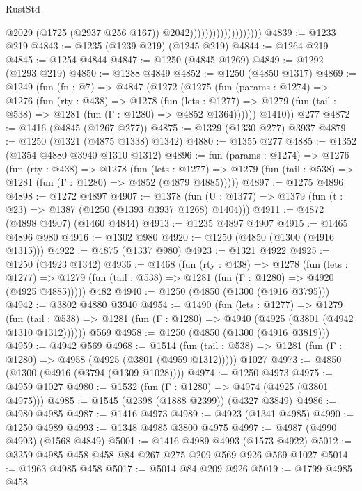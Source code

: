 \begin{lexlean}{RustStd}
\begin{coremodule}
{\begin{coremodule}
{{{{{{{{{{{{{                                          @2029
                                          (@1725 (@2937 @256 @167))
                                          @2042)))))))))))))))))))
@4839 := @1233 @219
@4843 := @1235 (@1239 @219) (@1245 @219)
@4844 := @1264 @219
@4845 := @1254 @4844
@4847 := @1250 (@4845 @1269)
@4849 := @1292 (@1293 @219)
@4850 := @1288 @4849
@4852 := @1250 (@4850 @1317)
@4869 := @1249
    (fun (fn : @7) =>
    @4847
      (@1272
        (@1275
          (fun (params : @1274) =>
          @1276
            (fun (rty : @438) =>
            @1278
              (fun (lets : @1277) =>
              @1279 (fun (tail : @538) => @1281 (fun (Γ : @1280) => @4852 @1364))))))
        @1410))
    @277
@4872 := @1416 (@4845 (@1267 @277))
@4875 := @1329 (@1330 @277) @3937
@4879 := @1250 (@1321 (@4875 @1338) @1342)
@4880 := @1355 @277
@4885 := @1352 (@1354 @4880 @3940 @1310 @1312)
@4896 := fun (params : @1274) =>
  @1276
    (fun (rty : @438) =>
    @1278
      (fun (lets : @1277) =>
      @1279 (fun (tail : @538) => @1281 (fun (Γ : @1280) => @4852 (@4879 @4885)))))
@4897 := @1275 @4896
@4898 := @1272 @4897
@4907 := @1378 (fun (U : @1377) => @1379 (fun (t : @23) => @1387 (@1250 (@1393 @3937 @1268) @1404)))
@4911 := @4872 (@4898 @4907) (@1460 @4844)
@4913 := @1235 @4897 @4907
@4915 := @1465 @4896 @980
@4916 := @1302 @980
@4920 := @1250 (@4850 (@1300 (@4916 @1315)))
@4922 := @4875 (@1337 @980)
@4923 := @1321 @4922
@4925 := @1250 (@4923 @1342)
@4936 := @1468
    (fun (rty : @438) =>
    @1278
      (fun (lets : @1277) =>
      @1279 (fun (tail : @538) => @1281 (fun (Γ : @1280) => @4920 (@4925 @4885)))))
    @482
@4940 := @1250 (@4850 (@1300 (@4916 @3795)))
@4942 := @3802 @4880 @3940
@4954 := @1490
    (fun (lets : @1277) =>
    @1279
      (fun (tail : @538) => @1281 (fun (Γ : @1280) => @4940 (@4925 (@3801 (@4942 @1310 @1312))))))
    @569
@4958 := @1250 (@4850 (@1300 (@4916 @3819)))
@4959 := @4942 @569
@4968 := @1514
    (fun (tail : @538) => @1281 (fun (Γ : @1280) => @4958 (@4925 (@3801 (@4959 @1312)))))
    @1027
@4973 := @4850 (@1300 (@4916 (@3794 (@1309 @1028))))
@4974 := @1250 @4973
@4975 := @4959 @1027
@4980 := @1532 (fun (Γ : @1280) => @4974 (@4925 (@3801 @4975)))
@4985 := @1545 (@2398 (@1888 @2399)) (@4327 @3849)
@4986 := @4980 @4985
@4987 := @1416 @4973
@4989 := @4923 (@1341 @4985)
@4990 := @1250 @4989
@4993 := @1348 @4985 @3800 @4975
@4997 := @4987 (@4990 @4993) (@1568 @4849)
@5001 := @1416 @4989 @4993 (@1573 @4922)
@5012 := @3259 @4985 @458 @458 @84 @267 @275 @209 @569 @926 @569 @1027
@5014 := @1963 @4985 @458
@5017 := @5014 @84 @209 @926
@5019 := @1799 @4985 @458
}}}}}}}}}}}}}
\end{coremodule}}
\end{coremodule}
\end{lexlean}
